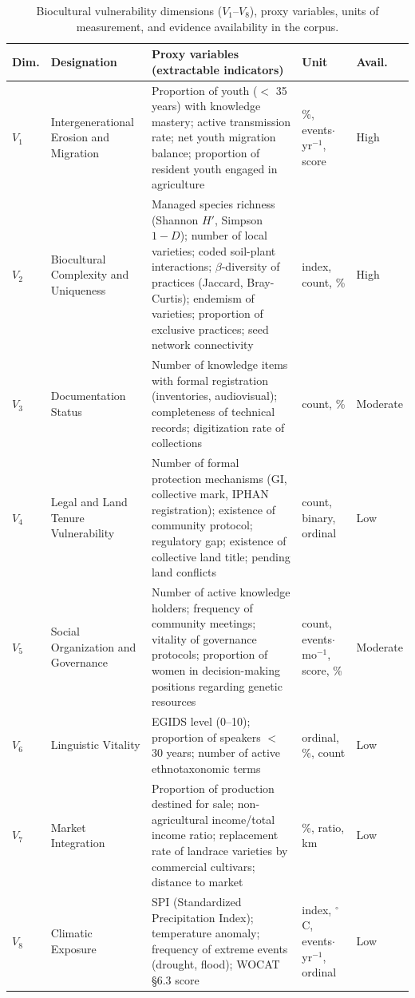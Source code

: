 \documentclass[12pt,a4paper]{article}
\begin{document}
\begin{table}[htbp]
\caption{Biocultural vulnerability dimensions ($V_1$--$V_8$), proxy variables, units of measurement, and evidence availability in the corpus.}
\label{tab:proxies}
\centering
\footnotesize
\begin{tabular}{p{0.8cm}p{2.5cm}p{4.2cm}p{2.2cm}p{1.5cm}}
\toprule
\textbf{Dim.} & \textbf{Designation} & \textbf{Proxy variables (extractable indicators)} & \textbf{Unit} & \textbf{Avail.} \\
\midrule
$V_1$ & Intergenerational Erosion and Migration & Proportion of youth ($<$ 35 years) with knowledge mastery; active transmission rate; net youth migration balance; proportion of resident youth engaged in agriculture & \%, events$\cdot$yr$^{-1}$, score & High \\
\addlinespace
$V_2$ & Biocultural Complexity and Uniqueness & Managed species richness (Shannon $H'$, Simpson $1-D$); number of local varieties; coded soil-plant interactions; $\beta$-diversity of practices (Jaccard, Bray-Curtis); endemism of varieties; proportion of exclusive practices; seed network connectivity & index, count, \% & High \\
\addlinespace
$V_3$ & Documentation Status & Number of knowledge items with formal registration (inventories, audiovisual); completeness of technical records; digitization rate of collections & count, \% & Moderate \\
\addlinespace
$V_4$ & Legal and Land Tenure Vulnerability & Number of formal protection mechanisms (GI, collective mark, IPHAN registration); existence of community protocol; regulatory gap; existence of collective land title; pending land conflicts & count, binary, ordinal & Low \\
\addlinespace
$V_5$ & Social Organization and Governance & Number of active knowledge holders; frequency of community meetings; vitality of governance protocols; proportion of women in decision-making positions regarding genetic resources & count, events$\cdot$mo$^{-1}$, score, \% & Moderate \\
\addlinespace
$V_6$ & Linguistic Vitality & EGIDS level (0--10); proportion of speakers $<$ 30 years; number of active ethnotaxonomic terms & ordinal, \%, count & Low \\
\addlinespace
$V_7$ & Market Integration & Proportion of production destined for sale; non-agricultural income/total income ratio; replacement rate of landrace varieties by commercial cultivars; distance to market & \%, ratio, km & Low \\
\addlinespace
$V_8$ & Climatic Exposure & SPI (Standardized Precipitation Index); temperature anomaly; frequency of extreme events (drought, flood); WOCAT \S6.3 score & index, $^\circ$C, events$\cdot$yr$^{-1}$, ordinal & Low \\
\bottomrule
\end{tabular}
\end{table}
\end{document}
